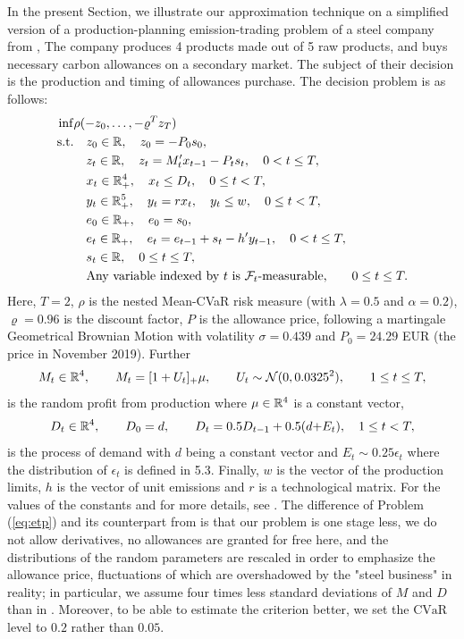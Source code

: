 \documentclass{article}              %
\begin{document}
In the present Section, we illustrate our approximation technique on
a simplified version of a production-planning emission-trading problem
of a steel company from \cite{zapletal2019multi}, The company produces
4 products made out of 5 raw products, and buys necessary carbon allowances
on a secondary market. The subject of their decision is the production
and timing of allowances purchase. The decision problem is as follows:
\begin{align}
\inf & \rho(-z_{0},\dots,-\varrho^{T}z_{T})\label{eq:etp}\\
\text{s.t.} &\quad z_{0}\in\mathbb{R},\quad z_{0}=-P_{0}s_{0},\nonumber \\
 &\quad z_{t}\in\mathbb{R},\quad z_{t}=M'_{t}x_{t-1}-P_{t}s_{t},\quad 0<t\leq T, \nonumber \\
 &\quad x_{t}\in\mathbb{R}_{+}^{4},\quad x_{t}\leq D_{t},\quad 0\leq t<T,\nonumber \\
 &\quad y_{t}\in\mathbb{R}_{+}^{5},\quad y_{t}=rx_{t},\quad y_{t}\leq w,\quad 0\leq t<T,\nonumber \\
 &\quad e_{0}\in\mathbb{R}_{+},\quad e_{0}=s_{0},\nonumber \\
 &\quad e_{t}\in\mathbb{R}_{+},\quad e_{t}=e_{t-1}+s_{t}-h'y_{t-1},\quad 0<t\leq T,\nonumber \\
 &\quad s_{t}\in\mathbb{R},\quad 0\leq t \leq T,\nonumber\\
 &\quad \text{Any variable indexed by $t$ is $\mathcal{F}_t$-measurable,}\qquad 0\leq t\leq T. \nonumber 
\end{align}
Here, $T=2$, $\rho$ is the nested Mean-CVaR risk measure (with $\lambda=0.5$
and $\alpha=0.2)$, $\varrho=0.96$ is the discount factor, $P$ is
the allowance price, following a martingale Geometrical Brownian Motion
with volatility $\sigma=0.439$ and $P_{0}=24.29$ EUR (the price
in November 2019). Further 
\[
M_{t}\in \mathbb{R}^4,\qquad M_{t}=[1+U_{t}]_{+}\mu,\qquad U_{t}\sim\mathcal{N}(0,0.0325^{2}),\qquad1\leq t\leq T,
\]
is the random profit from production where $\mu\in\mathbb{R}^{4}$ is a
constant vector, 
\[
D_{t}\in \mathbb{R}^4,\qquad D_{0}=d,\qquad D_{t}=0.5D_{t-1}+0.5(d\text{+\ensuremath{E_{t})}},\quad1\leq t<T,
\]
is the process of demand with $d$ being a
constant vector and $E_{t}\sim 0.25 \ensuremath{\epsilon_{t}}$ where the distribution of ${\epsilon_{t}}$ is defined 
in \cite{zapletal2019multi} 5.3. Finally, $w$ is the vector of the
production limits, $h$ is the vector of unit emissions and $r$ is
a technological matrix. For the values of the constants and for more details, see \cite{zapletal2019multi}. The difference of Problem (\ref{eq:etp}) and its counterpart from  \cite{zapletal2019multi} is that our problem is one stage less, we do not allow derivatives, no allowances are granted for free here, and the distributions of the random parameters are rescaled in order to emphasize the allowance price, fluctuations of which are overshadowed by the "steel business" in reality; in particular, we assume four times less standard deviations of $M$ and $D$ than in \cite{zapletal2019multi}. Moreover, to be able to estimate the criterion better, we set the $\mathrm{CVaR}$ level to $0.2$ rather than $0.05$.
\end{document}
